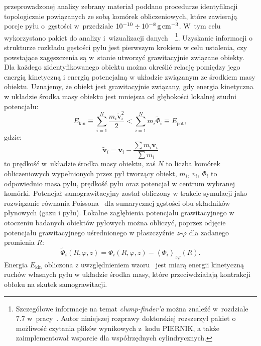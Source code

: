 przeprowadzonej analizy zebrany materiał poddano procedurze identyfikacji
topologicznie powiązanych ze sobą komórek obliczeniowych, które zawierają porcje
pyłu o~gęstości w~przedziale $10^{-10}\div10^{-8}\hbox{$\thinspace\textrm{g}$}\hbox{$\thinspace\textrm{cm}$}^{-3}$. W~tym celu
wykorzystano pakiet do analizy i~wizualizacji danych~\yt{}~\footnote{Szczegółowe
informacje na temat \emph{clump-finder'a} można znaleźć w~rozdziale 7.7
w~pracy~\cite{yt}. Autor niniejszej rozprawy doktorskiej rozszerzył pakiet
\yt{} o możliwość czytania plików wynikowych z~kodu PIERNIK, a także
zaimplementował wsparcie dla współrzędnych cylindrycznych.}.  Uzyskanie
informacji o strukturze rozkładu gęstości pyłu jest pierwszym krokiem w celu
ustalenia, czy powstające zagęszczenia są w~stanie utworzyć grawitacyjnie
związane obiekty. Dla każdego zidentyfikowanego obiektu można określić relację
pomiędzy jego energią kinetyczną i energią potencjalną w układzie związanym ze
środkiem masy obiektu. Uznajemy, że obiekt jest grawitacyjnie związany, gdy
energia kinetyczna w układzie środka masy obiektu jest mniejsza od głębokości
lokalnej studni potencjału:
%
\begin{equation}
   \label{eq:bcrit}
   E_{\textrm{kin}} \equiv \sum\limits_{i=1}^N \frac{m_i\tilde{\mathbf{v}}_i^2}{2} 
   < \sum\limits_{i=1}^N m_i\tilde{\Phi}_i \equiv E_{\textrm{pot}},
\end{equation}
%
gdzie:
\begin{equation}
   \tilde{\mathbf{v}}_i = \mathbf{v}_i - \frac{\sum m_i \mathbf{v}_i}{\sum m_i}
   \label{eq:velcom}
\end{equation}
to prędkość w~układzie środka masy obiektu, zaś $N$ to liczba komórek
obliczeniowych wypełnionych przez pył tworzący obiekt, $m_i$, $v_i$, $\Phi_i$ to
odpowiednio masa pyłu, prędkość pyłu oraz potencjał w centrum wybranej komórki. Potencjał
samograwitacyjny został obliczony w trakcie symulacji jako rozwiązanie
równania Poissona~ dla sumarycznej gęstości obu składników
płynowych (gazu i pyłu).  Lokalne zagłębienia potencjału grawitacyjnego w
otoczeniu badanych obiektów pyłowych można obliczyć, poprzez odjęcie potencjału
grawitacyjnego uśrednionego w płaszczyźnie \emph{z-$\varphi$} dla zadanego
promienia $R$:
%
\begin{equation}
   \tilde{\Phi}_i(R,\varphi,z) = \Phi_i(R,\varphi,z) -
   \left<\Phi_i\right>_{z\varphi}(R).
\end{equation}
%
Energia $E_{\textrm{kin}}$ obliczona z uwzględnieniem wzoru~
jest miarą energii kinetyczną ruchów własnych pyłu w układzie środka masy, które
przeciwdziałają kontrakcji obłoku na skutek samograwitacji.  
